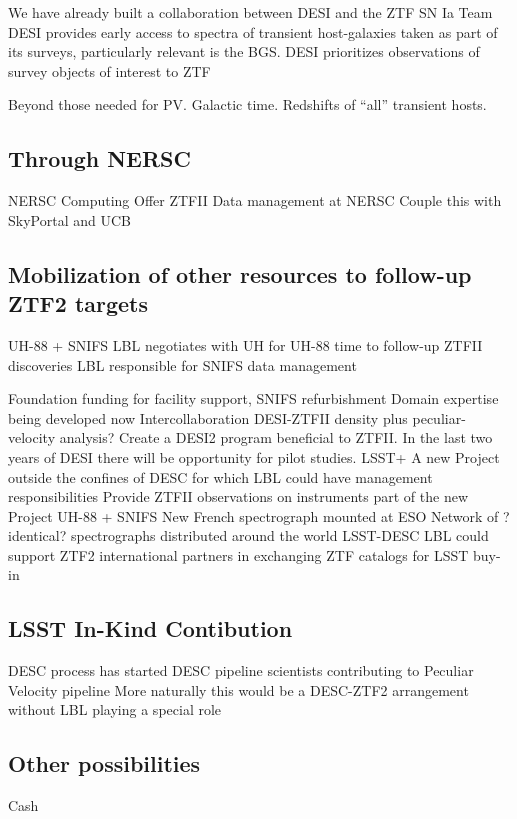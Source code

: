 \documentclass[11pt, oneside]{article}   	%
\begin{document}
We have already built a collaboration between DESI and the ZTF SN Ia Team
DESI provides early access to spectra of transient host-galaxies taken as part of its surveys, particularly relevant is the BGS.
DESI prioritizes observations of survey objects of interest to ZTF

Beyond those needed for PV.
Galactic time.  Redshifts of ``all'' transient hosts.

\subsection{Through NERSC}
NERSC Computing
Offer ZTFII Data management at NERSC
Couple this with SkyPortal and UCB

\subsection{Mobilization of other resources to follow-up ZTF2 targets}




UH-88 + SNIFS
LBL negotiates with UH for UH-88 time to follow-up ZTFII discoveries
LBL responsible for SNIFS data management

Foundation funding for facility support, SNIFS refurbishment
Domain expertise being developed now
Intercollaboration DESI-ZTFII density plus peculiar-velocity analysis?
Create a DESI2 program beneficial to ZTFII.   In the last two years of DESI there will be opportunity for pilot studies.
LSST+
A new Project outside the confines of DESC for which LBL could have management responsibilities
Provide ZTFII observations on instruments part of the new Project
UH-88 + SNIFS
New French spectrograph mounted at ESO
Network of ?identical? spectrographs distributed around the world
LSST-DESC
LBL could support ZTF2 international partners in exchanging ZTF catalogs for LSST buy-in

\subsection{LSST In-Kind Contibution}
DESC process has started
DESC pipeline scientists contributing to Peculiar Velocity pipeline
More naturally this would be a DESC-ZTF2 arrangement without LBL playing a special role



\subsection{Other possibilities}
Cash
\end{document}
